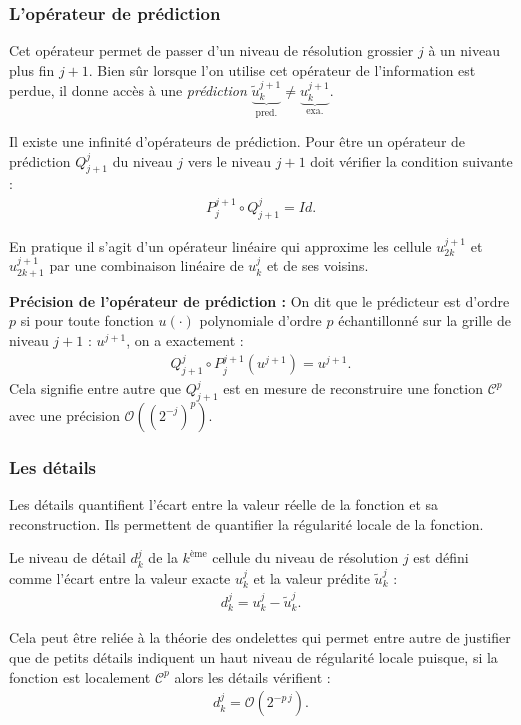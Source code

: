     \subsubsection{L'opérateur de prédiction}
        Cet opérateur permet de passer d'un niveau de résolution grossier $j$ à un niveau plus fin $j+1$.
        Bien sûr lorsque l'on utilise cet opérateur de l’information est perdue, il donne accès à une \emph{prédiction} $\underbrace{\tilde{u}_k^{j+1}}_{\mathrm{pred.}} \neq \underbrace{u_k^{j+1}}_{\mathrm{exa.}}$.
        \begin{definition}
            Il existe une infinité d'opérateurs de prédiction.
            Pour être un opérateur de prédiction $Q_{j+1}^j$ du niveau $j$ vers le niveau $j+1$ doit vérifier la condition suivante : 
            \begin{align}
                P^{j+1}_j \circ Q_{j+1}^j = Id.
            \end{align}
        \end{definition}
        En pratique il s'agit d'un opérateur linéaire qui approxime les cellule $u^{j+1}_{2k}$ et $u^{j+1}_{2k+1}$
        par une combinaison linéaire de $u^j_k$ et de ses voisins.\par 
        \textbf{Précision de l'opérateur de prédiction : } On dit que le prédicteur est d'ordre $p$
        si pour toute fonction $u(\cdot)$ polynomiale d'ordre $p$ échantillonné sur la grille de niveau $j+1$ : $u^{j+1}$,
        on a exactement :
        \begin{align}Q^{j}_{j+1} \circ P^{j+1}_j \left(u^{j+1} \right)= u^{j+1}.\end{align}
        Cela signifie entre autre que $Q^j_{j+1}$ est en mesure de reconstruire une fonction $\mathcal{C}^p$ avec une précision $\mathcal{O}((2^{-j})^p)$.
    \subsubsection{Les détails}
        Les détails quantifient l'écart entre la valeur réelle de la fonction et sa reconstruction. 
        Ils permettent de quantifier la régularité locale de la fonction.
        \begin{definition}[Détails]
            Le niveau de détail $d_k^j$ de la $k^{\mathrm{ème}}$ cellule du niveau de résolution $j$ est défini comme l'écart
            entre la valeur exacte $u^j_k$ et la valeur prédite $\tilde{u}^j_k$ : 
            \begin{align}
                d_k^j = u^j_k - \tilde{u}^j_k.
            \end{align}
        \end{definition}
        Cela peut être reliée à la théorie des ondelettes \cite{KaberPostel1999,duart2011} qui permet entre autre de justifier 
        que de petits détails indiquent un haut niveau de régularité locale puisque, si la fonction est localement $\mathcal{C}^p$
        alors les détails vérifient \cite{KaberPostel1999} : 
        \begin{align}\label{eq:regularite_details}
        d_k^j = \mathcal{O}(2^{-p\, j}).
        \end{align}

